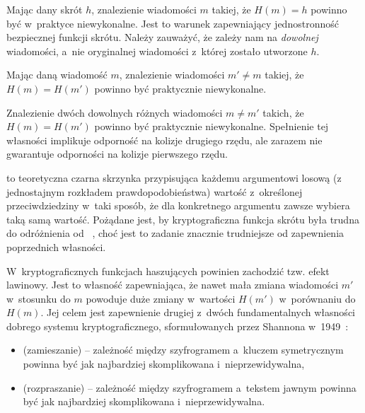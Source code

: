 \label{sec:preimage_resistance}%
Mając dany skrót $h$, znalezienie wiadomości $m$ takiej, że $H(m) = h$ powinno
być w~praktyce niewykonalne. Jest to warunek zapewniający jednostronność
bezpiecznej funkcji skrótu. Należy zauważyć, że zależy nam na \emph{dowolnej}
wiadomości, a~nie oryginalnej wiadomości z~której zostało utworzone $h$.

\label{sec:second_preimage_resistance}%
Mając daną wiadomość $m$, znalezienie wiadomości $m' \neq m$ takiej, że $H(m) =
H(m')$ powinno być praktycznie niewykonalne.

\label{sec:collision_resistance}%
Znalezienie dwóch dowolnych różnych wiadomości $m \neq m'$ takich, że $H(m) =
H(m')$ powinno być praktycznie niewykonalne. Spełnienie tej własności implikuje
odporność na kolizje drugiego rzędu, ale zarazem nie gwarantuje odporności na
kolizje pierwszego rzędu.

 to teoretyczna czarna skrzynka przypisująca każdemu
argumentowi losową (z jednostajnym rozkładem prawdopodobieństwa) wartość
z~określonej przeciwdziedziny w~taki sposób, że dla konkretnego argumentu
zawsze wybiera taką samą wartość. Pożądane jest, by kryptograficzna funkcja
skrótu była trudna do odróżnienia od ~\cite{random_oracle},
choć jest to zadanie znacznie trudniejsze od zapewnienia poprzednich własności.

\label{sec:avalance_effect}%
W~kryptograficznych funkcjach haszujących powinien zachodzić tzw. efekt
lawinowy. Jest to własność zapewniająca, że nawet mała zmiana wiadomości $m'$
w~stosunku do $m$ powoduje duże zmiany w~wartości $H(m')$ w~porównaniu do
$H(m)$. Jej celem jest zapewnienie drugiej z~dwóch fundamentalnych własności
dobrego systemu kryptograficznego, sformułowanych przez Shannona
w~1949~\cite{confusion_diffusion}:

\begin{itemize}

    \item {} (zamieszanie) -- zależność między szyfrogramem
    a~kluczem symetrycznym powinna być jak najbardziej skomplikowana
    i~nieprzewidywalna,

    \item {} (rozpraszanie) -- zależność między szyfrogramem
    a~tekstem jawnym powinna być jak najbardziej skomplikowana
    i~nieprzewidywalna.

\end{itemize}

